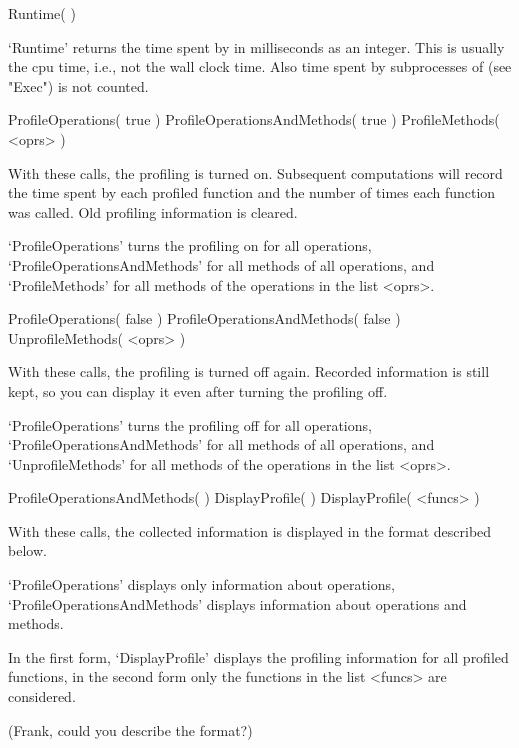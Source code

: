 
\>Runtime(  )

`Runtime' returns the time spent by {\GAP} in milliseconds as an integer.
This is usually the cpu time, i.e., not the wall clock time.
Also time spent by subprocesses of {\GAP} (see "Exec") is not counted.



\>ProfileOperations( true )
\>ProfileOperationsAndMethods( true )
\>ProfileMethods( <oprs> )

With these calls, the profiling is turned on.
Subsequent computations will record the time spent by each profiled
function and the number of times each function was called.
Old profiling information is cleared.

`ProfileOperations' turns the profiling on for all operations,
`ProfileOperationsAndMethods' for all methods of all operations,
and `ProfileMethods' for all methods of the operations in the list
<oprs>.


\>ProfileOperations( false )
\>ProfileOperationsAndMethods( false )
\>UnprofileMethods( <oprs> )

With these calls, the profiling is turned off again.
Recorded information is still kept, so you can  display it even after
turning the profiling off.

`ProfileOperations' turns the profiling off for all operations,
`ProfileOperationsAndMethods' for all methods of all operations,
and `UnprofileMethods' for all methods of the operations in the list
<oprs>.


\>ProfileOperationsAndMethods(  )
\>DisplayProfile(  )
\>DisplayProfile( <funcs> )

With these calls, the collected information is displayed in the format
described below.

`ProfileOperations' displays only information about operations,
`ProfileOperationsAndMethods' displays information about operations
and methods.

In the first form, `DisplayProfile' displays the profiling information
for all profiled functions,
in the second form only the functions in the list <funcs> are
considered.



(Frank, could you describe the format?)



